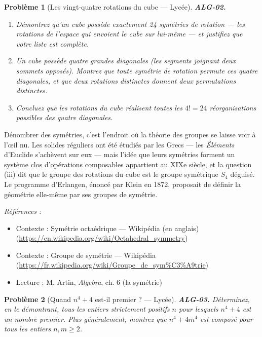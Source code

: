 \documentclass[11pt]{article}
\newtheorem{problem}{Problème}
\newenvironment{refs}{\par\small\noindent\emph{Références :}\begin{itemize}\setlength\itemsep{0pt}}{\end{itemize}\normalsize}
\begin{document}
\bigskip

\begin{problem}[{Les vingt-quatre rotations du cube --- Lycée}]
\textbf{ALG-02.} \begin{enumerate}
\item[(i)] Démontrez qu'un cube possède exactement 24 symétries de rotation
--- les rotations de l'espace qui envoient le cube sur lui-même --- et justifiez que votre liste est complète.
\item[(ii)] Un cube possède quatre grandes diagonales (les segments joignant deux sommets opposés). Montrez que toute
symétrie de rotation permute ces quatre diagonales, et que deux rotations distinctes donnent deux permutations
distinctes.
\item[(iii)] Concluez que les rotations du cube réalisent \textit{toutes} les
$4! = 24$ réorganisations possibles des quatre diagonales.
\end{enumerate}

\end{problem}

\noindent Dénombrer des symétries, c'est l'endroit où la théorie des groupes se laisse voir à l'\oe{}il nu.
Les solides réguliers ont été étudiés par les Grecs --- les \textit{Éléments} d'Euclide s'achèvent sur eux --- mais
l'idée que leurs symétries forment un système clos d'opérations composables appartient au XIXe siècle,
et la question (iii) dit que le groupe des rotations du cube \og{} est \fg{} le groupe symétrique $S_4$ déguisé.
Le programme d'Erlangen, énoncé par Klein en 1872, proposait de définir la géométrie elle-même par ses groupes de symétrie.

\begin{refs}
\item Contexte : Symétrie octaédrique --- Wikipédia (en anglais) (\url{https://en.wikipedia.org/wiki/Octahedral_symmetry})
\item Contexte : Groupe de symétrie --- Wikipédia (\url{https://fr.wikipedia.org/wiki/Groupe_de_sym%C3%A9trie})
\item Lecture : M. Artin, \textit{Algebra}, ch. 6 (la symétrie)
\end{refs}

\bigskip

\begin{problem}[{Quand $n^4 + 4$ est-il premier ? --- Lycée}]
\textbf{ALG-03.} Déterminez, en le démontrant, tous les entiers strictement positifs $n$ pour lesquels
$n^4 + 4$ est un nombre premier. Plus généralement, montrez que $n^4 + 4m^4$ est composé pour tous les
entiers $n, m \ge 2$.
\end{problem}
\end{document}
